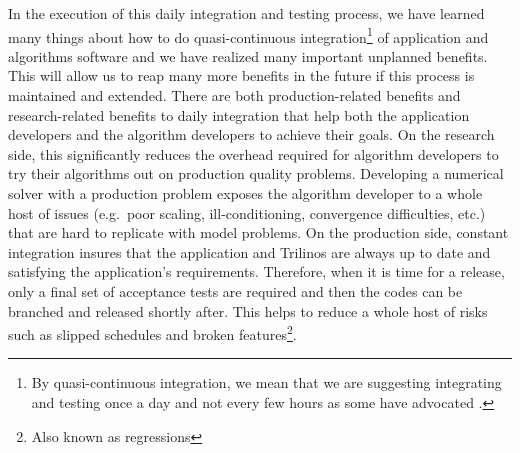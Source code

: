 \documentclass[pdf,ps2pdf,11pt]{SANDreport}
\begin{document}
In the execution of this daily integration and testing process, we have
learned many things about how to do quasi-continuous integration\footnote{By
quasi-continuous integration, we mean that we are suggesting integrating and
testing once a day and not every few hours as some have advocated
{}\cite{book:continuous-integration}.}  of application and algorithms software
and we have realized many important unplanned benefits.  This will allow us to
reap many more benefits in the future if this process is maintained and
extended.  There are both production-related benefits and research-related
benefits to daily integration that help both the application developers and
the algorithm developers to achieve their goals.  On the research side, this
significantly reduces the overhead required for algorithm developers to try
their algorithms out on production quality problems.  Developing a numerical
solver with a production problem exposes the algorithm developer to a whole
host of issues (e.g.\ poor scaling, ill-conditioning, convergence
difficulties, etc.) that are hard to replicate with model problems.  On the
production side, constant integration insures that the application and
Trilinos are always up to date and satisfying the application's requirements.
Therefore, when it is time for a release, only a final set of acceptance tests
are required and then the codes can be branched and released shortly after.
This helps to reduce a whole host of risks such as slipped schedules and
broken features\footnote{Also known as regressions}.
\end{document}
